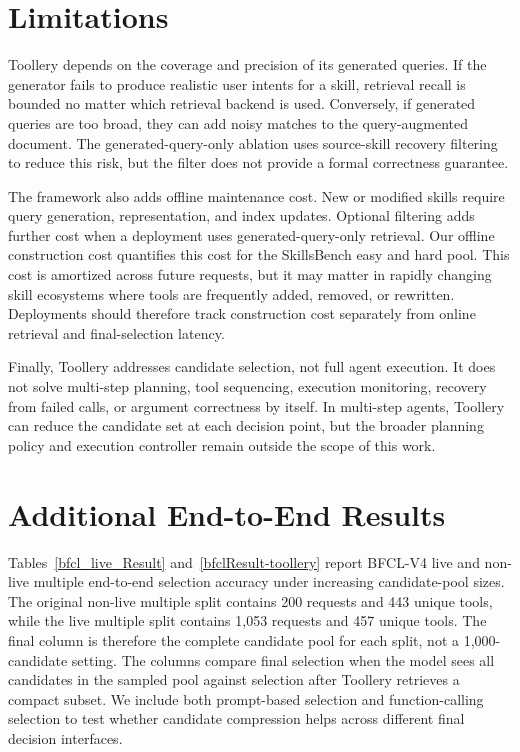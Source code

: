 \documentclass[11pt]{article}
\begin{document}
\newpage
\section{Limitations}
\label{sec:limitations}

Toollery depends on the coverage and precision of its generated queries. If the generator fails to produce realistic user intents for a skill, retrieval recall is bounded no matter which retrieval backend is used. Conversely, if generated queries are too broad, they can add noisy matches to the query-augmented document. The generated-query-only ablation uses source-skill recovery filtering to reduce this risk, but the filter does not provide a formal correctness guarantee.

The framework also adds offline maintenance cost. New or modified skills require query generation, representation, and index updates. Optional filtering adds further cost when a deployment uses generated-query-only retrieval. Our offline construction cost quantifies this cost for the SkillsBench easy and hard pool. This cost is amortized across future requests, but it may matter in rapidly changing skill ecosystems where tools are frequently added, removed, or rewritten. Deployments should therefore track construction cost separately from online retrieval and final-selection latency.

Finally, Toollery addresses candidate selection, not full agent execution. It does not solve multi-step planning, tool sequencing, execution monitoring, recovery from failed calls, or argument correctness by itself. In multi-step agents, Toollery can reduce the candidate set at each decision point, but the broader planning policy and execution controller remain outside the scope of this work.




\clearpage
\newpage
\appendix

\section{Additional End-to-End Results}
\label{app:end-to-end-results}
Tables~\ref{bfcl_live_Result} and~\ref{bfclResult-toollery} report BFCL-V4 live and non-live multiple end-to-end selection accuracy under increasing candidate-pool sizes. The original non-live multiple split contains 200 requests and 443 unique tools, while the live multiple split contains 1,053 requests and 457 unique tools. The final column is therefore the complete candidate pool for each split, not a 1,000-candidate setting. The columns compare final selection when the model sees all candidates in the sampled pool against selection after Toollery retrieves a compact subset. We include both prompt-based selection and function-calling selection to test whether candidate compression helps across different final decision interfaces.


\end{document}
